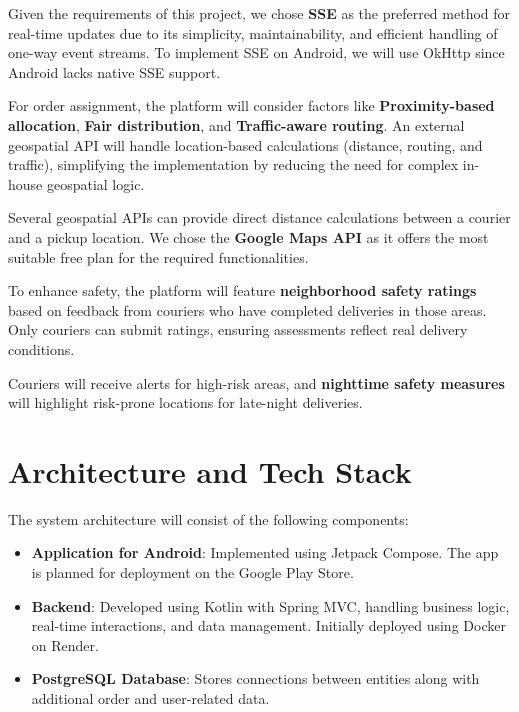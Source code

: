 \documentclass[a4paper,twoside,11pt]{article}
\begin{document}
{Given the requirements of this project, we chose \textbf{SSE} as the preferred method for real-time updates due to its simplicity, maintainability, and efficient handling of one-way event streams. To implement SSE on Android, we will use OkHttp since Android lacks native SSE support.

\vspace{2mm}

For order assignment, the platform will consider factors like \textbf{Proximity-based allocation}, \textbf{Fair distribution}, and \textbf{Traffic-aware routing}. An external geospatial API will handle location-based calculations (distance, routing, and traffic), simplifying the implementation by reducing the need for complex in-house geospatial logic.

\vspace{2mm}

Several geospatial APIs can provide direct distance calculations between a courier and a pickup location. We chose the \textbf{Google Maps API} as it offers the most suitable free plan for the required functionalities.

\vspace{2mm}

To enhance safety, the platform will feature \textbf{neighborhood safety ratings} based on feedback from couriers who have completed deliveries in those areas. Only couriers can submit ratings, ensuring assessments reflect real delivery conditions.  

Couriers will receive alerts for high-risk areas, and \textbf{nighttime safety measures} will highlight risk-prone locations for late-night deliveries.

\section*{Architecture and Tech Stack}

The system architecture will consist of the following components:

\begin{itemize}
    \item \textbf{Application for Android}: Implemented using Jetpack Compose. The app is planned for deployment on the Google Play Store.
    \item \textbf{Backend}: Developed using Kotlin with Spring MVC, handling business logic, real-time interactions, and data management. Initially deployed using Docker on Render.
    \item \textbf{PostgreSQL Database}: Stores connections between entities along with additional order and user-related data.
\end{itemize}

}
\end{document}
